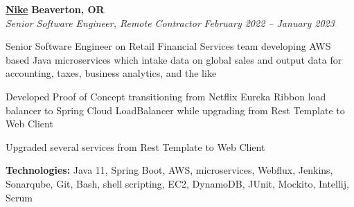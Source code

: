 %
    \headerrow
        {\textbf{\href{https://www.nike.com/}{Nike}}}
        {\textbf{Beaverton, OR}}
    \\
    \headerrow
        {\emph{Senior Software Engineer, Remote Contractor}}
        {\emph{February 2022 -- January 2023}}
    \begin{itemize*}
        \item Senior Software Engineer on Retail Financial Services team developing AWS based Java microservices which intake data on global sales and output data for accounting, taxes, business analytics, and the like
        \item Developed Proof of Concept transitioning from Netflix Eureka Ribbon load balancer to Spring Cloud LoadBalancer while upgrading from Rest Template to Web Client
        \item Upgraded several services from Rest Template to Web Client
    \end{itemize*}

    \hspace{1.0em}
        {\textbf{Technologies:} Java 11, Spring Boot, AWS, microservices, Webflux, Jenkins, Sonarqube, Git, Bash, shell scripting, EC2, DynamoDB, JUnit, Mockito, Intellij, Scrum}

